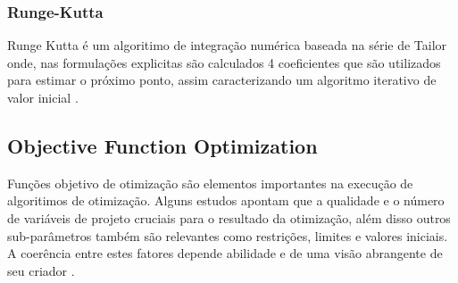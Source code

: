 \subsubsection{Runge-Kutta}
Runge Kutta é um algoritimo de integração numérica baseada na série de Tailor onde,
nas formulações explicitas são calculados 4 coeficientes que são utilizados para estimar
o próximo ponto, assim caracterizando um algoritmo iterativo de valor inicial \cite{bettis79,dormand80}.

\subsection{Objective Function Optimization}
Funções objetivo de otimização são elementos importantes na execução de algoritimos
de otimização. Alguns estudos apontam que a qualidade e o número de variáveis de
projeto cruciais para o resultado da otimização, além disso outros sub-parâmetros
também são relevantes como restrições, limites e valores iniciais. A coerência entre
estes fatores depende abilidade e de uma visão abrangente de seu criador \cite{albaghdadi21}.

